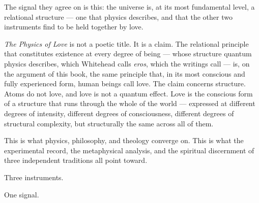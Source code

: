 The signal they agree on is this: the universe is, at its most fundamental
level, a relational structure --- one that physics describes, and that the
other two instruments find to be held together by love.

\emph{The Physics of Love} is not a poetic title.  It is a claim.  The
relational principle that constitutes existence at every degree of being ---
whose structure quantum physics describes, which Whitehead calls \emph{eros},
which the \bahai writings call \mahabbat --- is, on the argument of this book,
the same principle that, in its most conscious and fully experienced form,
human beings call love.  The claim concerns structure.  Atoms do not love, and
love is not a quantum effect.  Love is the conscious form of a structure that
runs through the whole of the world ---
expressed at different degrees of intensity, different degrees of consciousness,
different degrees of structural complexity, but structurally the same across all
of them.

This is what physics, philosophy, and theology converge on.  This is what the
experimental record, the metaphysical analysis, and the spiritual discernment of
three independent traditions all point toward.

Three instruments.

One signal.

